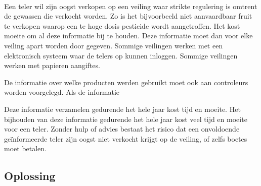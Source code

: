 \paragraph {} Een teler wil zijn oogst verkopen op een veiling waar strikte regulering is
omtrent de gewassen die verkocht worden. Zo is het bijvoorbeeld niet aanvaardbaar fruit te
verkopen waarop een te hoge dosis pesticide wordt aangetroffen. Het kost moeite om al deze
informatie bij te houden. Deze informatie moet dan voor elke veiling apart worden door
gegeven. Sommige veilingen werken met een elektronisch systeem waar de telers op kunnen
inloggen. Sommige veilingen werken met papieren aangiftes.

De informatie over welke producten werden gebruikt moet ook aan controleurs worden
voorgelegd. 
Als de informatie 

Deze informatie verzamelen gedurende het hele jaar kost tijd en moeite.
Het bijhouden van deze
informatie gedurende het hele jaar kost veel tijd en moeite voor een teler. Zonder hulp of
advies bestaat het risico dat een onvoldoende geïnformeerde teler zijn oogst niet verkocht
krijgt op de veiling, of zelfs boetes moet betalen.


\subsection {Oplossing}

